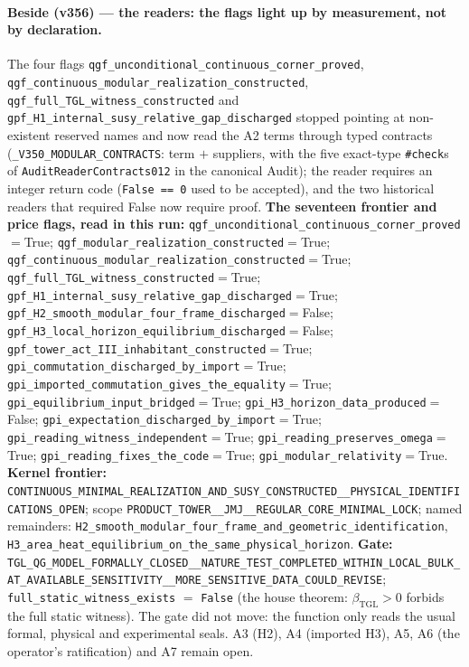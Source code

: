 \documentclass[11pt]{article}
\newcommand{\bTGL}{\beta_{\mathrm{TGL}}}\newcommand{\Msun}{M_{\odot}}\newcommand{\TGL}{\mathrm{TGL}}
\theoremstyle{definition}\newtheorem{deriv}{Derivation}
\begin{document}
\paragraph*{Beside (v356) --- the readers: the flags light up by measurement, not by declaration.} The four flags \texttt{qgf\_unconditional\_continuous\_corner\_proved}, \texttt{qgf\_continuous\_modular\_realization\_constructed}, \texttt{qgf\_full\_TGL\_witness\_constructed} and \texttt{gpf\_H1\_internal\_susy\_relative\_gap\_discharged} stopped pointing at non-existent reserved names and now read the A2 terms through typed contracts (\texttt{\_V350\_MODULAR\_CONTRACTS}: term $+$ suppliers, with the five exact-type \texttt{\#check}s of \texttt{AuditReaderContracts012} in the canonical Audit); the reader requires an integer return code (\texttt{False == 0} used to be accepted), and the two historical readers that required False now require proof. \textbf{The seventeen frontier and price flags, read in this run:} \texttt{qgf\_unconditional\_continuous\_corner\_proved}$=$True; \texttt{qgf\_modular\_realization\_constructed}$=$True; \texttt{qgf\_continuous\_modular\_realization\_constructed}$=$True; \texttt{qgf\_full\_TGL\_witness\_constructed}$=$True; \texttt{gpf\_H1\_internal\_susy\_relative\_gap\_discharged}$=$True; \texttt{gpf\_H2\_smooth\_modular\_four\_frame\_discharged}$=$False; \texttt{gpf\_H3\_local\_horizon\_equilibrium\_discharged}$=$False; \texttt{gpf\_tower\_act\_III\_inhabitant\_constructed}$=$True; \texttt{gpi\_commutation\_discharged\_by\_import}$=$True; \texttt{gpi\_imported\_commutation\_gives\_the\_equality}$=$True; \texttt{gpi\_equilibrium\_input\_bridged}$=$True; \texttt{gpi\_H3\_horizon\_data\_produced}$=$False; \texttt{gpi\_expectation\_discharged\_by\_import}$=$True; \texttt{gpi\_reading\_witness\_independent}$=$True; \texttt{gpi\_reading\_preserves\_omega}$=$True; \texttt{gpi\_reading\_fixes\_the\_code}$=$True; \texttt{gpi\_modular\_relativity}$=$True. \textbf{Kernel frontier:} \texttt{CONTINUOUS\_MINIMAL\_REALIZATION\_AND\_SUSY\_CONSTRUCTED\_\_PHYSICAL\_IDENTIFICATIONS\_OPEN}; scope \texttt{PRODUCT\_TOWER\_\_JMJ\_\_REGULAR\_CORE\_MINIMAL\_LOCK}; named remainders: \texttt{H2\_smooth\_modular\_four\_frame\_and\_geometric\_identification}, \texttt{H3\_area\_heat\_equilibrium\_on\_the\_same\_physical\_horizon}. \textbf{Gate:} \texttt{TGL\_QG\_MODEL\_FORMALLY\_CLOSED\_\_NATURE\_TEST\_COMPLETED\_WITHIN\_LOCAL\_BULK\_AT\_AVAILABLE\_SENSITIVITY\_\_MORE\_SENSITIVE\_DATA\_COULD\_REVISE}; \texttt{full\_static\_witness\_exists} $=$ \texttt{False} (the house theorem: $\bTGL>0$ forbids the full static witness). The gate did not move: the function only reads the usual formal, physical and experimental seals. A3 (H2), A4 (imported H3), A5, A6 (the operator's ratification) and A7 remain open.
\end{document}

